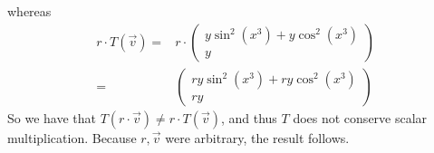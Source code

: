 \documentclass[12pt]{article}
\newenvironment{problem}[2][Problem]
{
	\begin{trivlist} 
		\item[\hskip \labelsep {\bfseries #1 #2:}]
	}
{
	\end{trivlist}
	}
\newenvironment{solution}[1][Solution]
{
	\begin{trivlist} 
		\item[\hskip \labelsep {\itshape #1:}]
	}
	{
	\end{trivlist}
}
\begin{document}
\begin{problem}{5}
\begin{solution}


\newpage

whereas
\begin{align*}
r\cdot T (\vec{v}) =& r\cdot \begin{pmatrix} y \sin ^2 (x^3) + y \cos ^2 (x^3)\\ y\end{pmatrix}\\
=& \begin{pmatrix} ry \sin ^2 (x^3) + ry \cos ^2 (x^3)\\ ry\end{pmatrix}
\end{align*}
So we have that $T (r \cdot \vec{v}) \neq r\cdot T (\vec{v})$, and thus $T$ does not conserve scalar multiplication. Because $r, \vec{v}$ were arbitrary, the result follows.
\end{solution}


\end{problem}
\end{document}
